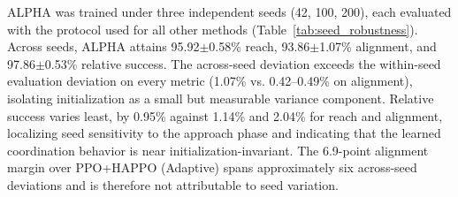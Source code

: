 \documentclass[a4paper,fleqn]{cas-dc}
\begin{document}
\begin{table}[h]
\caption{Seed robustness of PPO+MAPPO (Adaptive) and of the $\alpha$-detached control (Sec.~\ref{limitations}). Each seed evaluated over 10 independent trials across 4,096 parallel environments (Mean $\pm$ Std across trials). Each block's final row reports Mean $\pm$ Std across the three training seeds.}
\centering
{}
\label{tab:seed_robustness}
\end{table}

ALPHA was trained under three independent seeds (42, 100, 200), each evaluated with the protocol used for all other methods (Table~\ref{tab:seed_robustness}). Across seeds, ALPHA attains 95.92$\pm$0.58\% reach, 93.86$\pm$1.07\% alignment, and 97.86$\pm$0.53\% relative success. The across-seed deviation exceeds the within-seed evaluation deviation on every metric (1.07\% vs. 0.42--0.49\% on alignment), isolating initialization as a small but measurable variance component. Relative success varies least, by 0.95\% against 1.14\% and 2.04\% for reach and alignment, localizing seed sensitivity to the approach phase and indicating that the learned coordination behavior is near initialization-invariant. The 6.9-point alignment margin over PPO+HAPPO (Adaptive) spans approximately six across-seed deviations and is therefore not attributable to seed variation.
\end{document}

